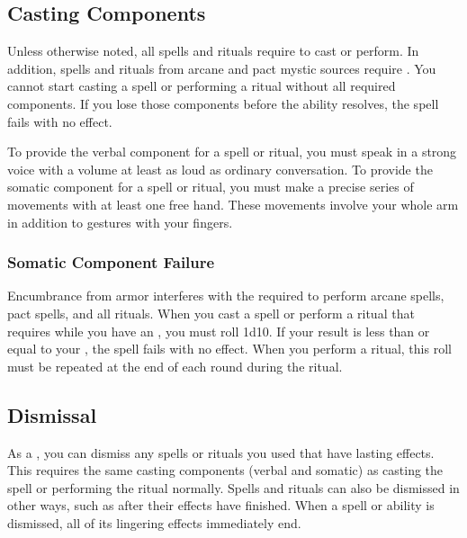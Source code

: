     \subsection{Casting Components}\label{Casting Components}
        Unless otherwise noted, all spells and rituals require  to cast or perform.
        In addition, spells and rituals from arcane and pact mystic sources require .
        You cannot start casting a spell or performing a ritual without all required components.
        If you lose those components before the ability resolves, the spell fails with no effect.

        To provide the verbal component for a spell or ritual, you must speak in a strong voice with a volume at least as loud as ordinary conversation.
        To provide the somatic component for a spell or ritual, you must make a precise series of movements with at least one free hand.
        These movements involve your whole arm in addition to gestures with your fingers.

        \subsubsection{Somatic Component Failure}\label{Somatic Component Failure}
            Encumbrance from armor interferes with the  required to perform arcane spells, pact spells, and all rituals.
            When you cast a spell or perform a ritual that requires  while you have an , you must roll 1d10.
            If your result is less than or equal to your , the spell fails with no effect.
            When you perform a ritual, this roll must be repeated at the end of each round during the ritual.

    \subsection{Dismissal}
        As a , you can dismiss any spells or rituals you used that have lasting effects.
        This requires the same casting components (verbal and somatic) as casting the spell or performing the ritual normally.
        Spells and rituals can also be dismissed in other ways, such as after their effects have finished.
        When a spell or ability is dismissed, all of its lingering effects immediately end.

